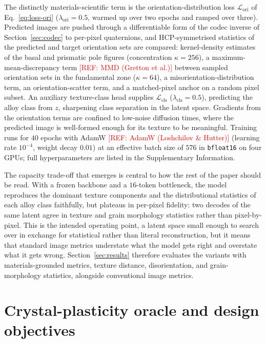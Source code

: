 \documentclass[preprint,12pt]{elsarticle}
\newcommand{\refneeded}[1]{\textcolor{red}{[REF: #1]}} %
\begin{document}
The distinctly materials-scientific term is the orientation-distribution loss $\mathcal{L}_{\mathrm{ori}}$ of Eq.~\eqref{eq:loss-ori} ($\lambda_{\mathrm{ori}} = 0.5$, warmed up over two epochs and ramped over three). Predicted images are pushed through a differentiable form of the codec inverse of Section~\ref{sec:codec} to per-pixel quaternions, and HCP-symmetrised statistics of the predicted and target orientation sets are compared: kernel-density estimates of the basal and prismatic pole figures (concentration $\kappa=256$), a maximum-mean-discrepancy term \refneeded{MMD (Gretton et al.)} between sampled orientation sets in the fundamental zone ($\kappa=64$), a misorientation-distribution term, an orientation-scatter term, and a matched-pixel anchor on a random pixel subset. An auxiliary texture-class head supplies $\mathcal{L}_{\mathrm{cls}}$ ($\lambda_{\mathrm{cls}} = 0.5$), predicting the alloy class from $z$, sharpening class separation in the latent space. Gradients from the orientation terms are confined to low-noise diffusion times, where the predicted image is well-formed enough for its texture to be meaningful. Training runs for $40$ epochs with AdamW \refneeded{AdamW (Loshchilov \& Hutter)} (learning rate $10^{-4}$, weight decay $0.01$) at an effective batch size of $576$ in \texttt{bfloat16} on four GPUs; full hyperparameters are listed in the Supplementary Information.

The capacity trade-off that emerges is central to how the rest of the paper should be read. With a frozen backbone and a $16$-token bottleneck, the model reproduces the dominant texture components and the distributional statistics of each alloy class faithfully, but plateaus in per-pixel fidelity: two decodes of the same latent agree in texture and grain morphology statistics rather than pixel-by-pixel. This is the intended operating point, a latent space small enough to search over in exchange for statistical rather than literal reconstruction, but it means that standard image metrics understate what the model gets right and overstate what it gets wrong. Section~\ref{sec:results} therefore evaluates the variants with materials-grounded metrics, texture distance, disorientation, and grain-morphology statistics, alongside conventional image metrics.


\section{Crystal-plasticity oracle and design objectives}
\label{sec:oracle}
\end{document}
